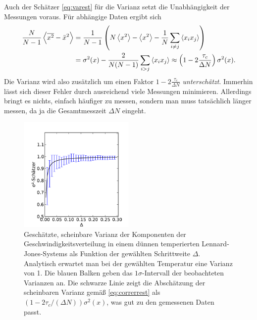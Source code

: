Auch der Schätzer \eqref{eq:varest} für die Varianz setzt die
Unabhängigkeit der Messungen voraus. Für abhängige Daten ergibt sich
\begin{align}
  \frac{N}{N-1}\left\langle{\overline{x^2} - \bar{x}^2}\right\rangle
  &= \frac{1}{N-1}\left(N\left\langle{x^2}\right\rangle - \left\langle{x^2}\right\rangle
    - \frac{1}{N}\sum_{i\neq j} \left\langle{x_ix_j}\right\rangle\right)\nonumber\\
  &= \sigma^2(x) - \frac{2}{N(N-1)}\sum_{i> j} \left\langle{x_ix_j}\right\rangle
  \approx \left(1 - 2\frac{\tau_c}{\Delta N}\right)\sigma^2(x).
\end{align}
Die Varianz wird also zusätzlich um einen Faktor $1 -
2\frac{\tau_c}{\Delta N}$ \emph{unterschätzt}. Immerhin lässt sich
dieser Fehler durch ausreichend viele Messungen minimieren. Allerdings
bringt es nichts, einfach häufiger zu messen, sondern man muss
tatsächlich länger messen, da ja die Gesamtmesszeit $\Delta N$
eingeht.

\begin{figure}
  \centering
  \includegraphics[width=0.5\textwidth]{plots/error}
  \caption{Geschätzte, scheinbare Varianz der Komponenten der
    Geschwindigkeitsverteilung in einem dünnen temperierten
    Lennard-Jones-Systems als Funktion der gewählten Schrittweite
    $\Delta$. Analytisch erwartet man bei der gewählten Temperatur
    eine Varianz von 1. Die blauen Balken geben das
    $1\sigma$-Intervall der beobachteten Varianzen an. Die schwarze
    Linie zeigt die Abschätzung der scheinbaren Varianz gemäß
    \eqref{eq:correrrest} als $(1-2\tau_c/(\Delta N))\sigma^2(x)$, was
    gut zu den gemessenen Daten passt.}
  \label{fig:error}
\end{figure}

